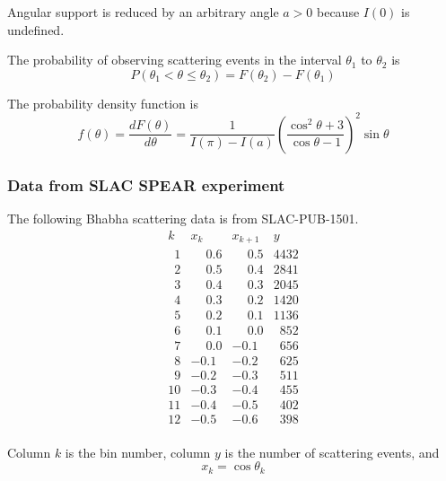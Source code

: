 Angular support is reduced by an arbitrary angle $a>0$ because $I(0)$ is undefined.

\bigskip
The probability of observing scattering events in the interval $\theta_1$ to $\theta_2$ is
\begin{equation*}
P(\theta_1<\theta\le\theta_2)=F(\theta_2)-F(\theta_1)
\end{equation*}

The probability density function is
\begin{equation*}
f(\theta)=\frac{dF(\theta)}{d\theta}
=\frac{1}{I(\pi)-I(a)}
\left(\frac{\cos^2\theta+3}{\cos\theta-1}\right)^2
\sin\theta
\end{equation*}

\subsubsection*{Data from SLAC SPEAR experiment}
The following Bhabha scattering data is from SLAC-PUB-1501.
\begin{equation*}
\begin{matrix}
k & x_k & x_{k+1} & y\\
\phantom01 & \phantom+0.6 & \phantom+0.5 & 4432\\
\phantom02 & \phantom+0.5 & \phantom+0.4 & 2841\\
\phantom03 & \phantom+0.4 & \phantom+0.3 & 2045\\
\phantom04 & \phantom+0.3 & \phantom+0.2 & 1420\\
\phantom05 & \phantom+0.2 & \phantom+0.1 & 1136\\
\phantom06 & \phantom+0.1 & \phantom+0.0 & \phantom{0}852\\
\phantom07 & \phantom+0.0 & -0.1 & \phantom{0}656\\
\phantom08 & -0.1 & -0.2 & \phantom{0}625\\
\phantom09 & -0.2 & -0.3 & \phantom{0}511\\
10 & -0.3 & -0.4 & \phantom{0}455\\
11 & -0.4 & -0.5 & \phantom{0}402\\
12 & -0.5 & -0.6 & \phantom{0}398\\
\end{matrix}
\end{equation*}

Column $k$ is the bin number, column $y$ is the number of scattering events, and
\begin{equation*}
x_k=\cos\theta_k
\end{equation*}

